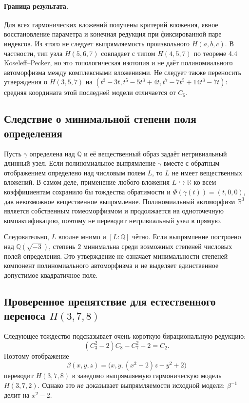 \paragraph{Граница результата.}
Для всех гармонических вложений получены критерий вложения,
явное восстановление параметра и конечная редукция при фиксированной
паре индексов. Из этого не следует выпрямляемость произвольного
$H(a,b,c)$. В частности, тип узла
$H(5,6,7)$ совпадает с типом $H(4,5,7)$ по теореме 4.4
Koseleff--Pecker, но это топологическая изотопия и не даёт
полиномиального автоморфизма между комплексными вложениями.
Не следует также переносить утверждения о $H(3,5,7)$ на
$(t^3-3t,t^5-5t^3+4t,t^7-7t^5+14t^3-7t)$:
средняя координата этой последней модели отличается от $C_5$.

\subsection{Следствие о минимальной степени поля определения}

Пусть $\gamma$ определена над $\mathbb Q$ и её вещественный образ
задаёт нетривиальный длинный узел. Если полиномиальное выпрямление
$\gamma$ вместе с обратным отображением определено над числовым полем
$L$, то $L$ не имеет вещественных вложений.
В самом деле, применение любого вложения $L\hookrightarrow\mathbb R$
ко всем коэффициентам сохранило бы тождества обратимости и
$\Phi(\gamma(t))=(t,0,0)$, дав невозможное вещественное выпрямление.
Полиномиальный автоморфизм $\mathbb R^3$ является собственным
гомеоморфизмом и продолжается на одноточечную компактификацию,
поэтому не переводит нетривиальный узел в прямую.

Следовательно, $L$ вполне мнимо и $[L:\mathbb Q]$ чётно.
Если выпрямление построено над $\mathbb Q(\sqrt{-3})$, степень $2$
минимальна среди возможных степеней числовых полей определения.
Это утверждение не означает минимальности степеней компонент
полиномиального автоморфизма и не выделяет единственное допустимое
квадратичное поле.

\subsection{Проверенное препятствие для естественного переноса $H(3,7,8)$}

Следующее тождество подсказывает очень короткую бирациональную редукцию:
\[
 (C_3^2-2)C_8-C_7^2+2=C_2.
\]
Поэтому отображение
\[
 \beta(x,y,z)=\bigl(x,y,(x^2-2)z-y^2+2\bigr)
\]
переводит $H(3,7,8)$ в заведомо выпрямляемую гармоническую модель
$H(3,7,2)$. Однако это \emph{не} доказывает выпрямляемости исходной
модели: $\beta^{-1}$ делит на $x^2-2$.

